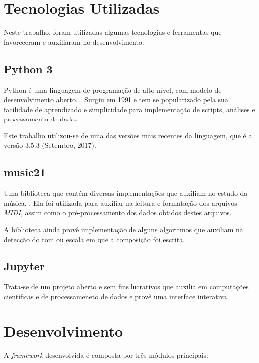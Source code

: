 \label{cap:analise}
\section{Tecnologias Utilizadas}

Neste trabalho, foram utilizadas algumas tecnologias e ferramentas que favoreceram e auxiliaram no desenvolvimento.

\subsection{Python 3}

Python é uma linguagem de programação de alto nível, com modelo de desenvolvimento aberto. \cite{python}. Surgiu em 1991 e tem se popularizado pela sua facilidade de aprendizado e simplicidade para implementação de scripts, análises e processamento de dados.

Este trabalho utilizou-se de uma das versões mais recentes da linguagem, que é a versão 3.5.3 (Setembro, 2017). 

\subsection{music21}

Uma biblioteca que contém diversas implementações que auxiliam no estudo da música. \cite{music21}.
Ela foi utilizada para auxiliar na leitura e formatação dos arquivos \textit{MIDI}, assim como o pré-processamento dos dados obtidos destes arquivos.

A biblioteca ainda provê implementação de alguns algoritmos que auxiliam na detecção do tom ou escala em que a composição foi escrita.

\subsection{Jupyter}

Trata-se de um projeto aberto e sem fins lucrativos que auxilia em computações científicas e de processameneto de dados e provê uma interface interativa.


\section{Desenvolvimento}

A \textit{framework} desenvolvida é composta por três módulos principais:

